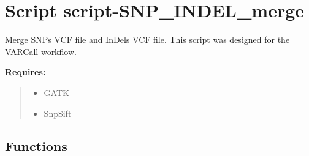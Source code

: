 %
%
%


\section{Script script-SNP\_INDEL\_merge}

    \label{script-SNP_INDEL_merge}
Merge SNPs VCF file and InDels VCF file. This script was designed for the 
VARCall workflow.

\textbf{Requires:}
\begin{quote}
  \begin{itemize}

  \item
    \setlength{\parskip}{0.6ex}
GATK



  \item SnpSift



\end{itemize}

\end{quote}



  \subsection{Functions}

    \label{script-SNP_INDEL_merge:get_parser}

    \vspace{0.5ex}

